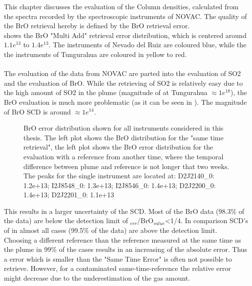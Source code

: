 This chapter discusses the evaluation of the  Column densities, calculated from the spectra recorded by the spectroscopic instruments of NOVAC. The quality of the BrO retrieval hereby is defined by the BrO retrieval error.\\
 shows the BrO "Multi Add" retrieval error distribution, which is centered around $1.1e^{13}$ to $1.4e^{13}$. The instruments of Nevado del Ruiz are coloured blue, while the the instruments of Tungurahua are coloured in yellow to red.\\
\\
The evaluation of the data from NOVAC are parted into the evaluation of SO2 and the evaluation of BrO. While the retrieving of SO2 is relatively easy due to the high amount of SO2 in the plume (magnitude of  at Tungurahua $\approx 1e^{18}$), the BrO evaluation is much more problematic (as it can be seen in ). The magnitude of BrO SCD is around $\approx 1e^{14}$. \\
%
\begin{figure}
	\caption{BrO error distribution shown for all instruments considered in this thesis. The left plot shows the BrO distribution for the "same time retrieval", the left plot shows the BrO error distribution for the evaluation with a reference from another time, where the temporal difference between plume and reference is not longer that two weeks. 
	The peaks for the single instrument are located at: D2J2140\_0: 1.2e+13;
		 I2J8548\_0: 1.3e+13;
		I2J8546\_0: 1.4e+13;
		D2J2200\_0: 1.4e+13;
		D2J2201\_0: 1.1e+13}
	\label{fig:allbroerrordistribution}
\end{figure}
%
This results in a larger uncertainty of the   SCD. Most of the BrO data (98.3\% of the data) are below the detection limit of $_{err}$/BrO$_{value}$<1/4. In comparison SCD's of  in almost all cases (99.5\% of the data)  are above the detection limit. \\
%
Choosing a different reference than the reference measured at the same time as the plume in 99\% of the cases results in an increasing of the absolute error. 
Thus a  error which is smaller than the "Same Time Error" is often not  possible to retrieve. 
However, for a contaminated same-time-reference the relative error might decrease due to the underestimation of the gas amount. \\
